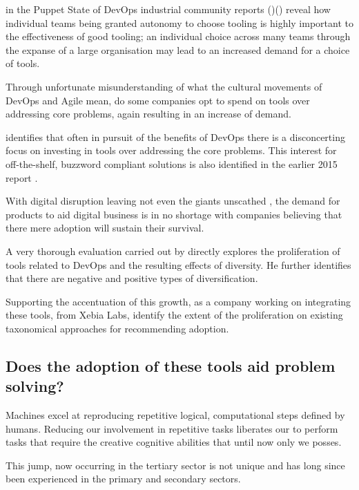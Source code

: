 \citeauthor{sodrPuppet2017} in the Puppet State of DevOps industrial community reports ()() reveal how individual teams being granted autonomy to choose tooling is highly important to the effectiveness of good tooling; an individual choice across many teams through the expanse of a large organisation may lead to an increased demand for a choice of tools.

Through unfortunate misunderstanding of what the cultural movements of DevOps and Agile mean, do some companies opt to spend on tools over addressing core problems, again resulting in an increase of demand.

\cite{sodrAccelerate2018} identifies that often in pursuit of the benefits of DevOps there is a disconcerting focus on investing in tools over addressing the core problems. This interest for off-the-shelf, buzzword compliant solutions is also identified in the earlier 2015 report \parencite{sodrPuppet2015}.

With digital disruption leaving not even the giants unscathed \parencite{weForum2016}, the demand for products to aid digital business is in no shortage with companies believing that there mere adoption will sustain their survival.

A very thorough evaluation carried out by \cite{kersten2018cambrian} directly explores the proliferation of tools related to DevOps and the resulting effects of diversity. He further identifies that there are negative and positive types of diversification.

Supporting the accentuation of this growth, as a company working on integrating these tools, \cite{xebiaLabs2019DevOpsReflections} from Xebia Labs, identify the extent of the proliferation on existing taxonomical approaches for recommending adoption.

\subsection{Does the adoption of these tools aid problem solving?}

Machines excel at reproducing repetitive logical, computational steps defined by humans. Reducing our involvement in repetitive tasks liberates our to perform tasks that require the creative cognitive abilities that until now only we posses.  

This jump, now occurring in the tertiary sector is not unique and has long since been experienced in the primary and secondary sectors. 

